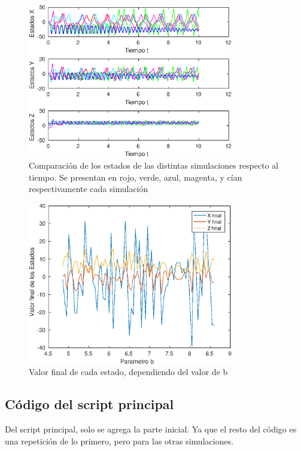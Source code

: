 \documentclass[12pt,letterpaper]{article}
\begin{document}

\begin{figure}
	\centering
	\includegraphics[width=0.8\textwidth]{pictures/comparacion}
	\caption{Comparación de los estados de las distintas simulaciones respecto al tiempo. Se presentan en rojo, verde, azul, magenta, y cían respectivamente cada simulación}

	\label{fig:comparacion}
\end{figure}



\begin{figure}
	\centering
	\includegraphics[width=0.8\textwidth]{pictures/sensibilidad}
	\caption{Valor final de cada estado, dependiendo del valor de b}
	\label{fig:sensibilidad}
\end{figure}

\subsection{Código del script principal}
 Del script principal, solo se agrega la parte inicial. Ya que el resto del código es una repetición de lo primero, pero para las otras simulaciones.
 
 
\end{document}
